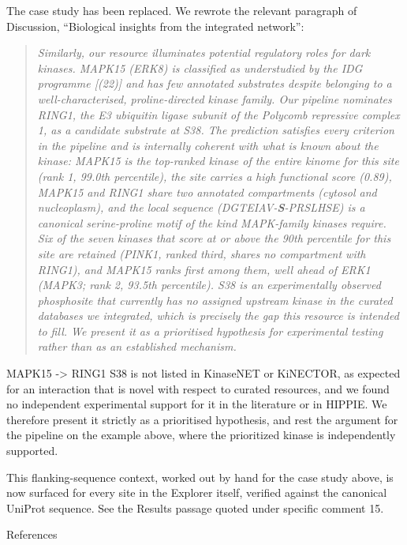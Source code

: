 \documentclass[
]{article}
\begin{document}
The case study has been replaced. We rewrote the relevant paragraph of
Discussion, ``Biological insights from the integrated network'':

\begin{quote}
\emph{Similarly, our resource illuminates potential regulatory roles for
dark kinases. MAPK15 (ERK8) is classified as understudied by the IDG
programme {[}(22){]} and has few annotated substrates despite belonging
to a well-characterised, proline-directed kinase family. Our pipeline
nominates RING1, the E3 ubiquitin ligase subunit of the Polycomb
repressive complex 1, as a candidate substrate at S38. The prediction
satisfies every criterion in the pipeline and is internally coherent
with what is known about the kinase: MAPK15 is the top-ranked kinase of
the entire kinome for this site (rank 1, 99.0th percentile), the site
carries a high functional score (0.89), MAPK15 and RING1 share two
annotated compartments (cytosol and nucleoplasm), and the local sequence
(DGTEIAV-\textbf{S}-PRSLHSE) is a canonical serine-proline motif of the
kind MAPK-family kinases require. Six of the seven kinases that score at
or above the 90th percentile for this site are retained (PINK1, ranked
third, shares no compartment with RING1), and MAPK15 ranks first among
them, well ahead of ERK1 (MAPK3; rank 2, 93.5th percentile). S38 is an
experimentally observed phosphosite that currently has no assigned
upstream kinase in the curated databases we integrated, which is
precisely the gap this resource is intended to fill. We present it as a
prioritised hypothesis for experimental testing rather than as an
established mechanism.}
\end{quote}

MAPK15 -\textgreater{} RING1 S38 is not listed in KinaseNET or KiNECTOR,
as expected for an interaction that is novel with respect to curated
resources, and we found no independent experimental support for it in
the literature or in HIPPIE. We therefore present it strictly as a
prioritised hypothesis, and rest the argument for the pipeline on the
example above, where the prioritized kinase is independently supported.

This flanking-sequence context, worked out by hand for the case study
above, is now surfaced for every site in the Explorer itself, verified
against the canonical UniProt sequence. See the Results passage quoted
under specific comment 15.

References

~
\end{document}
